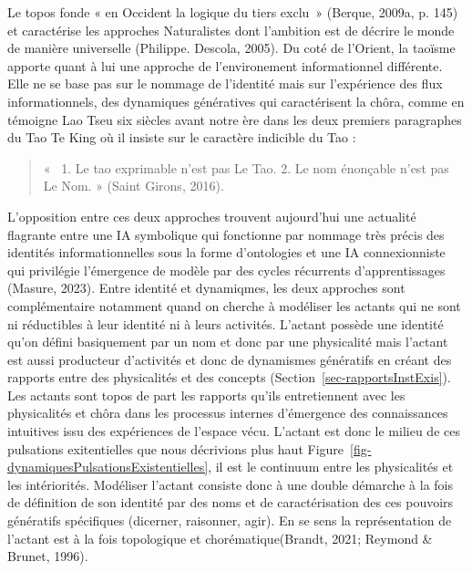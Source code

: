 \documentclass[
  a4paper,
  DIV=11,
  numbers=noendperiod]{scrreprt}
\begin{document}
Le topos fonde « en Occident la logique du tiers exclu~» (Berque, 2009a,
p. 145) et caractérise les approches Naturalistes dont l'ambition est de
décrire le monde de manière universelle (Philippe. Descola, 2005). Du
coté de l'Orient, la taoïsme apporte quant à lui une approche de
l'environement informationnel différente. Elle ne se base pas sur le
nommage de l'identité mais sur l'expérience des flux informationnels,
des dynamiques génératives qui caractérisent la chôra, comme en témoigne
Lao Tseu six siècles avant notre ère dans les deux premiers paragraphes
du Tao Te King où il insiste sur le caractère indicible du Tao :

\begin{quote}
«~ 1. Le tao exprimable n'est pas Le Tao. 2. Le nom énonçable n'est pas
Le Nom. » (Saint Girons, 2016).
\end{quote}

L'opposition entre ces deux approches trouvent aujourd'hui une actualité
flagrante entre une IA symbolique qui fonctionne par nommage très précis
des identités informationnelles sous la forme d'ontologies et une IA
connexionniste qui privilégie l'émergence de modèle par des cycles
récurrents d'apprentissages (Masure, 2023). Entre identité et
dynamiqmes, les deux approches sont complémentaire notamment quand on
cherche à modéliser les actants qui ne sont ni réductibles à leur
identité ni à leurs activités. L'actant possède une identité qu'on
défini basiquement par un nom et donc par une physicalité mais l'actant
est aussi producteur d'activités et donc de dynamismes génératifs en
créant des rapports entre des physicalités et des concepts
(Section~\ref{sec-rapportsInstExis}). Les actants sont topos de part les
rapports qu'ils entretiennent avec les physicalités et chôra dans les
processus internes d'émergence des connaissances intuitives issu des
expériences de l'espace vécu. L'actant est donc le milieu de ces
pulsations exitentielles que nous décrivions plus haut
Figure~\ref{fig-dynamiquesPulsationsExistentielles}, il est le continuum
entre les physicalités et les intériorités. Modéliser l'actant consiste
donc à une double démarche à la fois de définition de son identité par
des noms et de caractérisation des ces pouvoirs génératifs spécifiques
(dicerner, raisonner, agir). En se sens la représentation de l'actant
est à la fois topologique et chorématique(Brandt, 2021; Reymond \&
Brunet, 1996).
\end{document}
